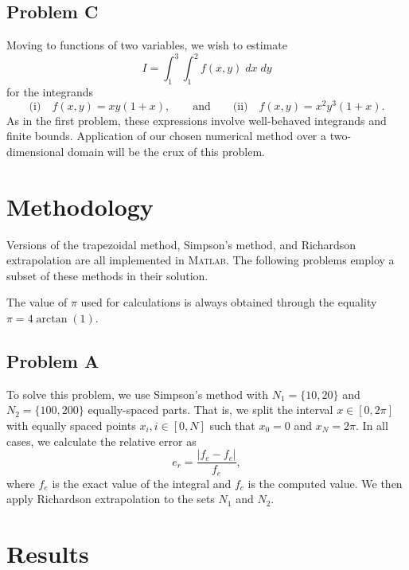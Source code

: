 \documentclass[11pt]{article}
\begin{document}
\subsection{Problem C}

Moving to functions of two variables, we wish to estimate
\begin{equation}
I = \int_1^3 \int_1^2 f(x,y) \; dx \; dy
\end{equation}
for the integrands
\begin{equation}
\text{(i)} \quad
f(x,y) = x y (1+x)
,
\qquad
\text{and}
\qquad
\text{(ii)} \quad
f(x,y) = x^2 y^3 (1+x)
.
\end{equation}
As in the first problem, these expressions involve well-behaved integrands and finite bounds. Application of our chosen numerical method over a two-dimensional domain will be the crux of this problem.

\section{Methodology}

Versions of the trapezoidal method, Simpson's method, and Richardson extrapolation are all implemented in \textsc{Matlab}. The following problems employ a subset of these methods in their solution.

The value of $\pi$ used for calculations is always obtained through the equality $\pi = 4 \arctan(1)$.

\subsection{Problem A}

To solve this problem, we use Simpson's method with $N_1=\{10,20\}$ and $N_2=\{100,200\}$ equally-spaced parts. That is, we split the interval $x \in [0,2\pi]$ with equally spaced points $x_i, i \in [0,N]$ such that $x_0 = 0$ and $x_N = 2\pi$. In all cases, we calculate the relative error as
\begin{equation}
e_r = \frac{\left| f_e - f_c \right|}{f_e}
,
\end{equation}
where $f_e$ is the exact value of the integral and $f_c$ is the computed value. We then apply Richardson extrapolation to the sets $N_1$ and $N_2$.

\section{Results}
\end{document}
